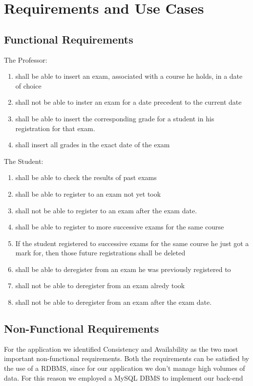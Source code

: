 \documentclass{report}
\begin{document}
\chapter*{Requirements and Use Cases}
\section*{Functional Requirements}
The Professor:
\begin{enumerate}
	\item shall be able to insert an exam, associated with a course he holds, in a date of choice
	\item shall not be able to inster an exam for a date precedent to the current date
	\item shall be able to insert the corresponding grade for a student in his registration for that exam.
	\item shall insert all grades in the exact date of the exam
\end{enumerate}
The Student:
\begin{enumerate}
	\item shall be able to check the results of past exams
	\item shall be able to register to an exam not yet took
	\item shall not be able to register to an exam after the exam date.
	\item shall be able to register to more successive exams for the same course
	\item If the student registered to successive exams for the same course he just got a mark for, then those future registrations shall be deleted
	\item shall be able to deregister from an exam he was previously registered to
	\item shall not be able to deregister from an exam alredy took
	\item shall not be able to deregister from an exam after the exam date.
\end{enumerate}

\section*{Non-Functional Requirements}
For the application we identified Consistency and Availability as the two most important non-functional requirements.
Both the requirements can be satisfied by the use of a RDBMS, since for our application we don't manage high volumes of data. For this reason we employed a MySQL DBMS to implement our back-end
\newpage
\end{document}

